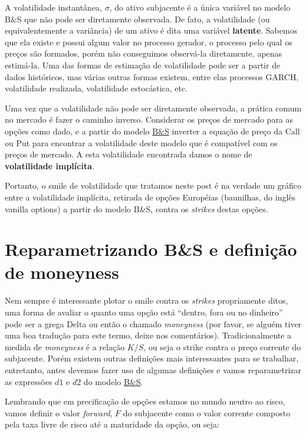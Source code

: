 \documentclass[]{book}
\theoremstyle{definition}
\theoremstyle{definition}
\theoremstyle{definition}
\theoremstyle{remark}
\begin{document}
A volatilidade instantânea, \(\sigma\), do ativo subjacente é a única
variável no modelo B\&S que não pode ser diretamente observada. De fato,
a volatilidade (ou equivalentemente a variância) de um ativo é dita uma
variável \textbf{latente}. Sabemos que ela existe e possui algum valor
no processo gerador, o processo pelo qual os preços são formados, porém
não conseguimos observá-la diretamente, apenas estimá-la. Uma das formas
de estimação de volatilidade pode ser a partir de dados históricos, mas
várias outras formas existem, entre elas processos GARCH, volatilidade
realizada, volatilidade estocástica, etc.

Uma vez que a volatilidade não pode ser diretamente observada, a prática
comum no mercado é fazer o caminho inverso. Considerar os preços de
mercado para as opções como dado, e a partir do modelo
\protect\hyperlink{bsm}{B\&S} inverter a equação de preço da Call ou Put
para encontrar a volatilidade deste modelo que é compatível com os
preços de mercado. A esta volatilidade encontrada damos o nome de
\textbf{volatilidade implícita}.

Portanto, o smile de volatilidade que tratamos neste post é na verdade
um gráfico entre a volatilidade implícita, retirada de opções Européias
(baunilhas, do inglês vanilla options) a partir do modelo B\&S, contra
os \emph{strikes} destas opções.

\section{Reparametrizando B\&S e definição de
moneyness}\label{reparametrizando}

Nem sempre é interessante plotar o smile contra os \emph{strikes}
propriamente ditos, uma forma de avaliar o quanto uma opção está
``dentro, fora ou no dinheiro'' pode ser a grega Delta ou então o
chamado \emph{moneyness} (por favor, se alguém tiver uma boa tradução
para este termo, deixe nos comentários). Tradicionalmente a medida de
\emph{moneyness} é a relação \(K/S\), ou seja o strike contra o preço
corrente do subjacente. Porém existem outras definições mais
interessantes para se trabalhar, entretanto, antes devemos fazer uso de
algumas definições e vamos reparametrizar as expressões \(d1\) e \(d2\)
do modelo \protect\hyperlink{bsm}{B\&S}.

Lembrando que em precificação de opções estamos no mundo neutro ao
risco, vamos definir o valor \emph{forward}, \(F\) do subjacente como o
valor corrente composto pela taxa livre de risco até a maturidade da
opção, ou seja:
\end{document}
